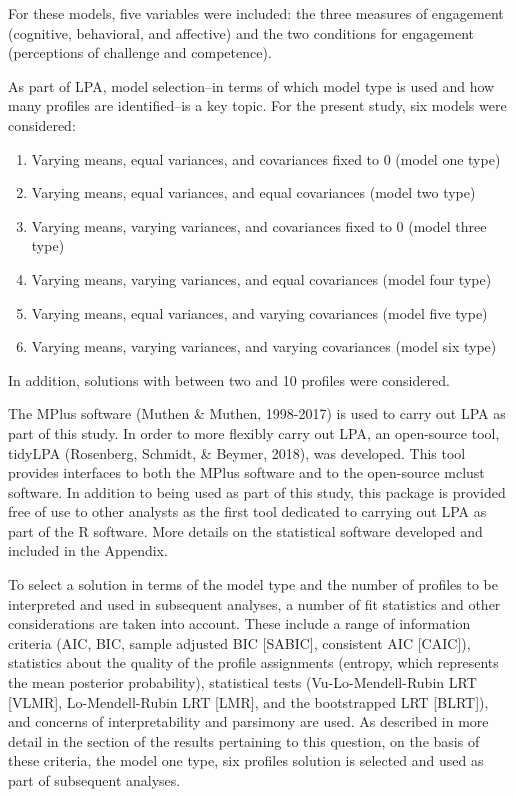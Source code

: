 \documentclass[]{book}
\providecommand{\tightlist}{%
  \setlength{\itemsep}{0pt}\setlength{\parskip}{0pt}}
\theoremstyle{definition}
\theoremstyle{definition}
\theoremstyle{definition}
\theoremstyle{remark}
\begin{document}
For these models, five variables were included: the three measures of
engagement (cognitive, behavioral, and affective) and the two conditions
for engagement (perceptions of challenge and competence).

As part of LPA, model selection--in terms of which model type is used
and how many profiles are identified--is a key topic. For the present
study, six models were considered:

\begin{enumerate}
\def\labelenumi{\arabic{enumi}.}
\tightlist
\item
  Varying means, equal variances, and covariances fixed to 0 (model one
  type)
\item
  Varying means, equal variances, and equal covariances (model two type)
\item
  Varying means, varying variances, and covariances fixed to 0 (model
  three type)
\item
  Varying means, varying variances, and equal covariances (model four
  type)
\item
  Varying means, equal variances, and varying covariances (model five
  type)
\item
  Varying means, varying variances, and varying covariances (model six
  type)
\end{enumerate}

In addition, solutions with between two and 10 profiles were considered.

The MPlus software (Muthen \& Muthen, 1998-2017) is used to carry out
LPA as part of this study. In order to more flexibly carry out LPA, an
open-source tool, tidyLPA (Rosenberg, Schmidt, \& Beymer, 2018), was
developed. This tool provides interfaces to both the MPlus software and
to the open-source mclust software. In addition to being used as part of
this study, this package is provided free of use to other analysts as
the first tool dedicated to carrying out LPA as part of the R software.
More details on the statistical software developed and included in the
Appendix.

To select a solution in terms of the model type and the number of
profiles to be interpreted and used in subsequent analyses, a number of
fit statistics and other considerations are taken into account. These
include a range of information criteria (AIC, BIC, sample adjusted BIC
{[}SABIC{]}, consistent AIC {[}CAIC{]}), statistics about the quality of
the profile assignments (entropy, which represents the mean posterior
probability), statistical tests (Vu-Lo-Mendell-Rubin LRT {[}VLMR{]},
Lo-Mendell-Rubin LRT {[}LMR{]}, and the bootstrapped LRT {[}BLRT{]}),
and concerns of interpretability and parsimony are used. As described in
more detail in the section of the results pertaining to this question,
on the basis of these criteria, the model one type, six profiles
solution is selected and used as part of subsequent analyses.
\end{document}
